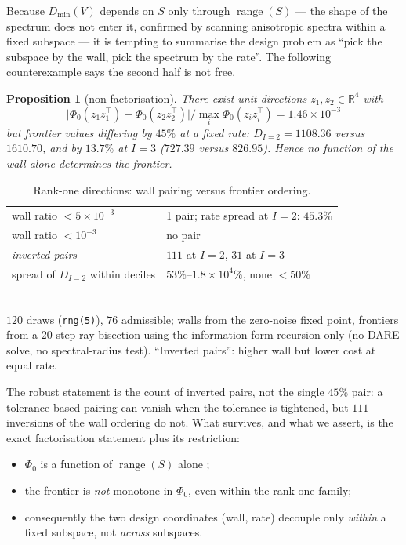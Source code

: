 \documentclass[journal]{IEEEtran}
\newtheorem{proposition}{Proposition}
\theoremstyle{remark}
\begin{document}
Because $D_{\min}(V)$ depends on $S$ only through $\operatorname{range}(S)$ ---
the shape of the spectrum does not enter it, confirmed by scanning anisotropic
spectra within a fixed subspace --- it is tempting to summarise the design
problem as ``pick the subspace by the wall, pick the spectrum by the rate''.
The following counterexample says the second half is not free.

\begin{proposition}[non-factorisation]
\label{pr:nofactor}
There exist unit directions $z_1,z_2\in\mathbb R^{4}$ with
\[
 \big|\Phi_0(z_1z_1^{\top})-\Phi_0(z_2z_2^{\top})\big|
 \big/\max_i\Phi_0(z_iz_i^{\top}) = 1.46\times10^{-3}
\]
but frontier values differing by $45\%$ at a fixed rate:
$D_{I=2}=1108.36$ versus $1610.70$, and by $13.7\%$ at $I=3$ ($727.39$ versus
$826.95$). Hence no function of the wall alone determines the frontier.
\end{proposition}

\begin{table}[h]
 \centering\caption{Rank-one directions: wall pairing versus frontier
 ordering.}
 \label{tab:nofactor}
 \begin{tabularx}{\columnwidth}{Xl}
 \hline
 wall ratio $<5\times10^{-3}$ & 1 pair; rate spread at $I=2$: $45.3\%$ \\
 wall ratio $<10^{-3}$ & no pair \\
 \emph{inverted pairs} & $111$ at $I=2$, $31$ at $I=3$ \\
 spread of $D_{I=2}$ within deciles & $53\%$--$1.8\times10^{4}\%$, none $<50\%$ \\
 \hline
 \end{tabularx}
 \\[1pt]{\scriptsize $120$ draws (\texttt{rng(5)}), $76$ admissible; walls from
 the zero-noise fixed point, frontiers from a $20$-step ray bisection using the
 information-form recursion only (no DARE solve, no spectral-radius test).
 ``Inverted pairs'': higher wall but lower cost at equal rate.}
\end{table}

The robust statement is the count of inverted pairs, not the single $45\%$
pair: a tolerance-based pairing can vanish when the tolerance is tightened, but
$111$ inversions of the wall ordering do not. What survives, and what we assert,
is the exact factorisation statement plus its restriction:
\begin{itemize}
 \item $\Phi_0$ is a function of $\operatorname{range}(S)$ alone
;
 \item the frontier is \emph{not} monotone in $\Phi_0$, even within the rank-one
 family;
 \item consequently the two design coordinates (wall, rate) decouple only
 \emph{within} a fixed subspace, not \emph{across} subspaces.
\end{itemize}
\end{document}

